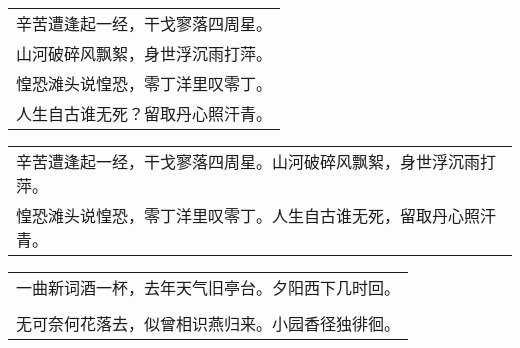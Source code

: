 \nopagebreak%
\nopagebreak%
\noindent\begin{minipage}{\linewidth}
  \vskip-3pt\begin{table}[H]
    \centering
    \begin{tabular}{@{}l@{}}
辛苦遭逢起一经，干戈寥落四周星。\\
山河破碎风飘絮，身世浮沉雨打萍。\\
惶恐滩头说惶恐，零丁洋里叹零丁。\\
人生自古谁无死？留取丹心照汗青。
    \end{tabular}
  \end{table}
\end{minipage}
\vspace{1cm}


\nopagebreak%
\nopagebreak%
\noindent\begin{minipage}{\linewidth}
  \vskip-3pt\begin{table}[H]
    \centering
    \begin{tabular}{@{}l@{}}
辛苦遭逢起一经，干戈寥落四周星。山河破碎风飘絮，身世浮沉雨打萍。\\
惶恐滩头说惶恐，零丁洋里叹零丁。人生自古谁无死，留取丹心照汗青。
    \end{tabular}
  \end{table}
\end{minipage}
\vspace{1cm}


\nopagebreak%
\nopagebreak%
\noindent\begin{minipage}{\linewidth}
  \vskip-3pt\begin{table}[H]
    \centering
    \begin{tabular}{@{}l@{}}
一曲新词酒一杯，去年天气旧亭台。夕阳西下几时回。\\
\\
无可奈何花落去，似曾相识燕归来。小园香径独徘徊。
    \end{tabular}
  \end{table}
\end{minipage}
\vspace{1cm}


